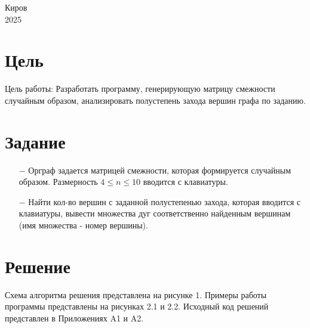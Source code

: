 \documentclass[oneside,a4paper,14pt]{extarticle}
\begin{document}
\begin{center}
	Киров\\
	2025
\end{center}

\newpage\thispagestyle{plain}

\section*{Цель}

Цель работы: Разработать программу, генерирующую матрицу смежности случайным образом, анализировать полустепень захода вершин графа по заданию.

\section*{Задание}
\begin{itemize}
	\item[$-$] Орграф задается матрицей смежности, которая формируется случайным образом. Размерность $ 4 \leq n \leq 10 $ вводится с клавиатуры.
  \item[$-$] Найти кол-во вершин с заданной полустепенью захода, которая вводится с клавиатуры, вывести множества дуг соответственно найденным вершинам (имя множества - номер вершины).
\end{itemize}
\section*{Решение}

Схема алгоритма решения представлена на рисунке 1. Примеры работы программы представлены на рисунках 2.1 и 2.2. Исходный код решений представлен в Приложениях A1 и A2.
\end{document}
